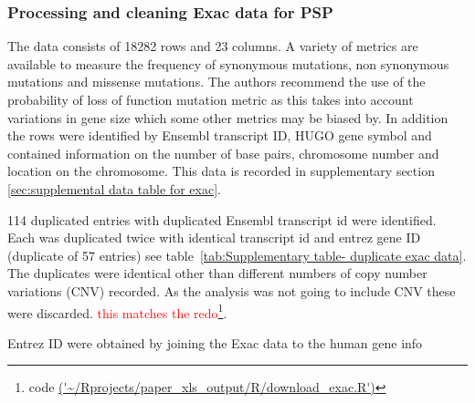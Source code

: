 \subsubsection{Processing and cleaning Exac data for PSP}
The data consists of 18282 rows and 23 columns. A variety of metrics are available to measure the frequency of synonymous mutations, non synonymous mutations and missense mutations. The authors recommend the use of the probability of loss of function mutation metric as this takes into account variations in gene size which some other metrics may be biased by. In addition the rows were identified by Ensembl transcript ID, HUGO gene symbol and contained information on the number of base pairs, chromosome number and location on the chromosome. This data is recorded in supplementary section~
\ref{sec:supplemental data table for exac}.



114 duplicated entries with duplicated Ensembl transcript id were identified. Each was duplicated twice with identical transcript id and entrez gene ID (duplicate of 57 entries) see table~\ref{tab:Supplementary table- duplicate exac data}. The duplicates were identical other than different numbers of copy number variations (CNV) recorded. As the analysis was not going to include CNV these were discarded.  \textcolor{red}{this matches the redo}\footnote{code \url{('~/Rprojects/paper_xls_output/R/download_exac.R')}}.


Entrez ID were obtained by joining the Exac data to the human gene info 





